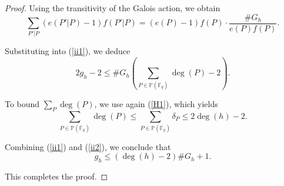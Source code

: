 \documentclass[10pt,a4paper]{amsart}
\begin{document}
\begin{proof}
Using the transitivity of the Galois action, we obtain
\[
\sum_{P'|P}(e(P'|P)-1)f(P'|P)
=
(e(P)-1)f(P)\cdot \frac{\#G_{h}}{e(P)f(P)}.
\]

Substituting into (\ref{ii1}), we deduce
\[
2g_{h}-2
\le
\#G_{h}\left ( \sum_{P\in \mathbb{P}(\mathbb{F}_{q}) }\deg(P)-2 \right ).
\]

To bound $\sum_{P}\deg(P)$, we use again (\ref{H1}), which yields
\begin{equation}\label{ii2}
\sum_{P\in \mathbb{P}(\mathbb{F}_{q}) }\deg(P)
\le
\sum_{P\in \mathbb{P}(\mathbb{F}_{q}) }\delta_{P}
\le
2\deg(h)-2.
\end{equation}

Combining (\ref{ii1}) and (\ref{ii2}), we conclude that
\[
g_{h}\le (\deg(h)-2)\#G_{h}+1.
\]

This completes the proof.
\end{proof}
\end{document}
